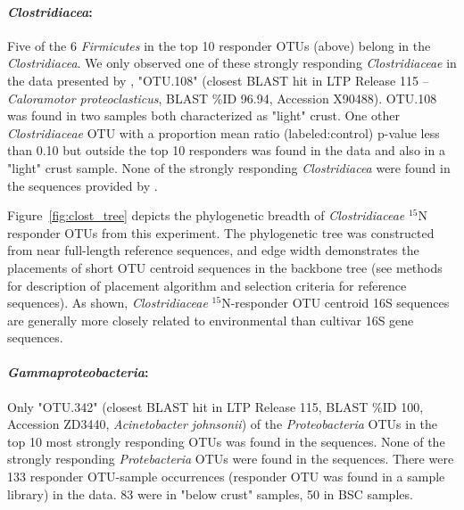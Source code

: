 \paragraph{\textbf{\textit{Clostridiacea}:}}
Five of the 6 \textit{Firmicutes} in the top 10 responder OTUs (above) belong
in the \textit{Clostridiacea}. We only observed one of these strongly
responding \textit{Clostridiaceae} in the data presented by
\citet{Garcia_Pichel_2013}, "OTU.108" (closest BLAST hit in LTP Release 115 --
\textit{Caloramotor proteoclasticus}, BLAST \%ID 96.94, Accession X90488).
OTU.108 was found in two samples both characterized as "light" crust. One other
\textit{Clostridiaceae} OTU with a proportion mean ratio (labeled:control)
p-value less than 0.10 but outside the top 10 responders was found in the
\citet{Garcia_Pichel_2013} data and also in a "light" crust sample. None of the
strongly responding \textit{Clostridiacea} were found in the sequences provided
by \citet{Steven_2013}.

Figure~\ref{fig:clost_tree} depicts the phylogenetic breadth of
\textit{Clostridiaceae} $^{15}$N responder OTUs from this experiment. The
phylogenetic tree was constructed from near full-length reference sequences,
and edge width demonstrates the placements of short OTU centroid sequences in
the backbone tree (see methods for description of placement algorithm and
selection criteria for reference sequences). As shown, \textit{Clostridiaceae}
$^{15}$N-responder OTU centroid 16S sequences are generally more closely
related to environmental than cultivar 16S gene sequences.   

\paragraph{\textbf{\textit{Gammaproteobacteria}:}} 
Only "OTU.342" (closest BLAST hit in LTP Release 115, BLAST \%ID 100, Accession
ZD3440, \textit{Acinetobacter johnsonii}) of the \textit{Proteobacteria} OTUs
in the top 10 most strongly responding OTUs was found in the
\citet{Garcia_Pichel_2013} sequences. None of the strongly responding
\textit{Protebacteria} OTUs were found in the \citet{Steven_2013} sequences.
There were 133 responder OTU-sample occurrences (responder OTU was found in a
sample library) in the \citet{Steven_2013} data.  83 were in "below crust"
samples, 50 in BSC samples.

